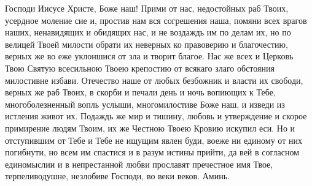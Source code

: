 \begin{mymulticols}

Господи Иисусе Христе, Боже наш! Прими от нас, недостойных раб Твоих, усердное моление сие и, простив нам вся согрешения наша, помяни всех врагов наших, ненавидящих и обидящих нас, и не воздаждь им по делам их, но по велицей Твоей милости обрати их неверных ко правоверию и благочестию, верных же во еже уклоншися от зла и творит благое. Нас же всех и Церковь Твою Святую всесильною Твоею крепостию от всякаго злаго обстояния милостивне избави. Отечество наше от любых безбожник и власти их свободи, верных же раб Твоих, в скорби и печали день и ночь вопиющих к Тебе, многоболезненный вопль услыши, многомилостиве Боже наш, и изведи из истления живот их. Подаждь же мир и тишину, любовь и утверждение и скорое примирение людям Твоим, их же Честною Твоею Кровию искупил еси. Но и отступившим от Тебе и Тебе не ищущим явлен буди, воеже ни единому от них погибнути, но всем им спастися и в разум истины прийти, да вей в согласном единомыслии и в непрестанной любви прославят пречестное имя Твое, терпеливодушне, незлобиве Господи, во веки веков. Аминь.

\end{mymulticols}

\mychapterending


